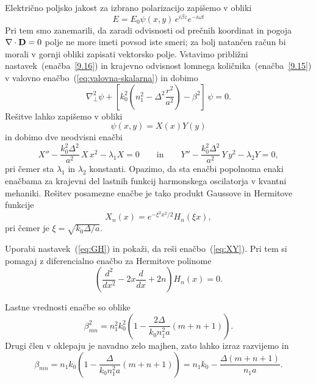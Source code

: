 Električno poljsko jakost za izbrano polarizacijo zapišemo v obliki 
\begin{equation}
E=E_{0}\psi(x,y)\, e^{i\beta z} e^{-i\omega t}
\label{9.16}
\end{equation}
Pri tem smo zanemarili, da zaradi odvisnosti od prečnih koordinat in pogoja $\nabla\cdot{\bf D}=0$
polje ne more imeti povsod iste smeri; za bolj natančen račun bi morali v gornji obliki 
zapisati vektorsko polje. Vstavimo približni
nastavek~(enačba~\ref{9.16}) in krajevno odvisnost lomnega količnika~(enačba~\ref{9.15})
v valovno enačbo~(\ref{eq:valovna-skalarna}) in dobimo 
\begin{equation}
\nabla_{\perp}^{2}\psi+\left[k_{0}^{2}\left(n_{1}^{2}-\Delta^{2}\frac{r^{2}}{a^2}\right)-
\beta^{2}\right]\,\psi=0.
\label{9.17}
\end{equation}
Rešitve lahko zapišemo v obliki
\begin{equation}
\psi(x,y) = X(x)Y(y)
\end{equation}
in dobimo dve neodvisni enačbi
\begin{equation}
X'' - \frac{k_0^2 \Delta^2}{a^2}\,X\,x^2 - \lambda_1 X = 0 \qquad \mathrm{in} \qquad
Y'' - \frac{k_0^2 \Delta^2}{a^2}\,Y\,y^2 - \lambda_2 Y = 0,
\label{eq:XY}
\end{equation}
pri čemer sta $\lambda_1$ in $\lambda_2$ konstanti. 
Opazimo, da sta enačbi popolnoma enaki enačbama za krajevni del lastnih funkcij 
harmonskega oscilatorja v kvantni mehaniki. Rešitev posamezne enačbe je tako 
produkt Gaussove in Hermitove funkcije
\begin{equation}
X_n(x) = e^{-\xi^2 x^2/2} H_n(\xi x),
\label{eq:GH}
\end{equation}
pri čemer je $\xi = \sqrt{k_0 \Delta/a}$.
\begin{definition}
Uporabi nastavek~(\ref{eq:GH}) in pokaži, da reši enačbo~(\ref{eq:XY}). Pri tem si pomagaj z 
diferencialno enačbo za Hermitove polinome
\begin{equation}
\left( \frac{d^2}{dx^2}-2x\frac{d}{dx}+2n \right) H_n(x) = 0.
\end{equation}
\end{definition}
Lastne vrednosti enačbe so oblike
\begin{equation}
\beta_{mn}^{2}=n_{1}^{2}k_{0}^{2}\left(1-\frac{2\Delta}{k_{0}n_{1}^2a}\left(m+n+1\right)\right).
\label{9.19}
\end{equation}
Drugi člen v oklepaju je navadno zelo majhen, zato lahko izraz razvijemo in 
\begin{equation}
\beta_{mn}=n_{1}k_{0}\left(1-\frac{\Delta}{k_{0}n_{1}^2 a}\left(m+n+1\right)\right)
= n_{1}k_{0} - \frac{\Delta \left(m+n+1\right)}{n_{1} a}.
\end{equation}
